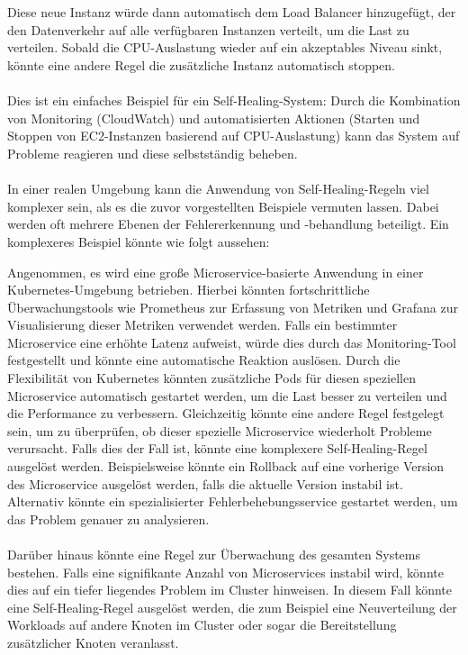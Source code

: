 \\\\
Diese neue Instanz würde dann automatisch dem Load Balancer hinzugefügt, der den Datenverkehr auf alle verfügbaren Instanzen verteilt, um die Last zu verteilen. Sobald die CPU-Auslastung wieder auf ein akzeptables Niveau sinkt, könnte eine andere Regel die zusätzliche Instanz automatisch stoppen.
\\\\
Dies ist ein einfaches Beispiel für ein Self-Healing-System: Durch die Kombination von Monitoring (CloudWatch) und automatisierten Aktionen (Starten und Stoppen von EC2-Instanzen basierend auf CPU-Auslastung) kann das System auf Probleme reagieren und diese selbstständig beheben.
\\\\
In einer realen Umgebung kann die Anwendung von Self-Healing-Regeln viel komplexer sein, als es die zuvor vorgestellten Beispiele vermuten lassen. Dabei werden oft mehrere Ebenen der Fehlererkennung und -behandlung beteiligt. Ein komplexeres Beispiel könnte wie folgt aussehen:

Angenommen, es wird eine große Microservice-basierte Anwendung in einer Kubernetes-Umgebung betrieben. Hierbei könnten fortschrittliche Überwachungstools wie Prometheus zur Erfassung von Metriken und Grafana zur Visualisierung dieser Metriken verwendet werden. Falls ein bestimmter Microservice eine erhöhte Latenz aufweist, würde dies durch das Monitoring-Tool festgestellt und könnte eine automatische Reaktion auslösen. Durch die Flexibilität von Kubernetes könnten zusätzliche Pods für diesen speziellen Microservice automatisch gestartet werden, um die Last besser zu verteilen und die Performance zu verbessern.
Gleichzeitig könnte eine andere Regel festgelegt sein, um zu überprüfen, ob dieser spezielle Microservice wiederholt Probleme verursacht. Falls dies der Fall ist, könnte eine komplexere Self-Healing-Regel ausgelöst werden. Beispielsweise könnte ein Rollback auf eine vorherige Version des Microservice ausgelöst werden, falls die aktuelle Version instabil ist. Alternativ könnte ein spezialisierter Fehlerbehebungsservice gestartet werden, um das Problem genauer zu analysieren.
\\\\
Darüber hinaus könnte eine Regel zur Überwachung des gesamten Systems bestehen. Falls eine signifikante Anzahl von Microservices instabil wird, könnte dies auf ein tiefer liegendes Problem im Cluster hinweisen. In diesem Fall könnte eine Self-Healing-Regel ausgelöst werden, die zum Beispiel eine Neuverteilung der Workloads auf andere Knoten im Cluster oder sogar die Bereitstellung zusätzlicher Knoten veranlasst.
